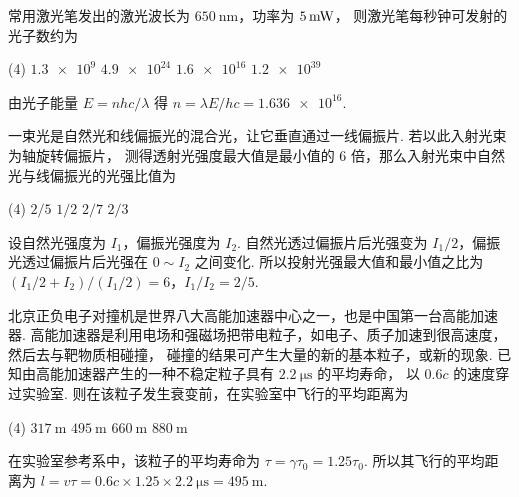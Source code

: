 \documentclass[quiet]{ctexart}
\begin{document}
\begin{problem}
  常用激光笔发出的激光波长为 $\qty{650}\nm$，功率为 $\qty5\mW$，
  则激光笔每秒钟可发射的光子数约为
  \begin{tasks}(4)
    \task $\num{1.3e9}$
    \task $\num{4.9e24}$
    \task[\true] $\num{1.6e16}$
    \task $\num{1.2e39}$
  \end{tasks}
\end{problem}
\begin{solution}
  由光子能量 $E = nhc/\lambda$ 得 $n = \lambda E/hc = \num{1.636e16}$.
\end{solution}

\begin{problem}
  一束光是自然光和线偏振光的混合光，让它垂直通过一线偏振片. 若以此入射光束为轴旋转偏振片，
  测得透射光强度最大值是最小值的 $6$ 倍，那么入射光束中自然光与线偏振光的光强比值为
  \begin{tasks}(4)
    \task[\true] $2/5$
    \task $1/2$
    \task $2/7$
    \task $2/3$
  \end{tasks}
\end{problem}
\begin{solution}
  设自然光强度为 $I_1$，偏振光强度为 $I_2$.
  自然光透过偏振片后光强变为 $I_1/2$，偏振光透过偏振片后光强在 $0 \sim I_2$ 之间变化.
  所以投射光强最大值和最小值之比为 $(I_1/2 + I_2)/(I_1/2) = 6$，$I_1/I_2 = 2/5$.
\end{solution}

\begin{problem}
  北京正负电子对撞机是世界八大高能加速器中心之一，也是中国第一台高能加速器.
  高能加速器是利用电场和强磁场把带电粒子，如电子、质子加速到很高速度，然后去与靶物质相碰撞，
  碰撞的结果可产生大量的新的基本粒子，或新的现象.
  已知由高能加速器产生的一种不稳定粒子具有 $\qty{2.2}\us$ 的平均寿命，
  以 $0.6c$ 的速度穿过实验室. 则在该粒子发生衰变前，在实验室中飞行的平均距离为
  \begin{tasks}(4)
    \task $\qty{317}\m$
    \task[\true] $\qty{495}\m$
    \task $\qty{660}\m$
    \task $\qty{880}\m$
  \end{tasks}
\end{problem}
\begin{solution}
  在实验室参考系中，该粒子的平均寿命为 $\tau = \gamma\tau_0 = 1.25\tau_0$.
  所以其飞行的平均距离为
  $l = v\tau = 0.6c \times 1.25 \times \qty{2.2}\us = \qty{495}\m$.
\end{solution}
\end{document}
